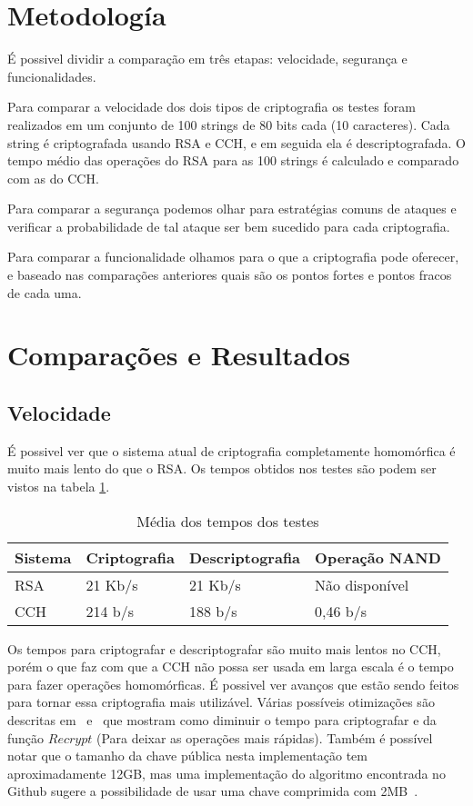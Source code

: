 \section{Metodología}
É possivel dividir a comparação em três etapas: velocidade, segurança e funcionalidades.

Para comparar a velocidade dos dois tipos de criptografia os testes foram realizados em um conjunto de 100 strings de 80 bits cada (10 caracteres). Cada string é criptografada usando RSA e CCH, e em seguida ela é descriptografada. O tempo médio das operações do RSA para as 100 strings é calculado e comparado com as do CCH.
	
Para comparar a segurança podemos olhar para estratégias comuns de ataques e verificar a probabilidade de tal ataque ser bem sucedido para cada criptografia.
	
Para comparar a funcionalidade olhamos para o que a criptografia pode oferecer, e baseado nas comparações anteriores quais são os pontos fortes e pontos fracos de cada uma.
	
\section{Comparações e Resultados}
	\subsection{Velocidade}
	É possivel ver que o sistema atual de criptografia completamente homomórfica é muito mais lento do que o RSA. Os tempos obtidos nos testes são podem ser vistos na tabela \ref{tab:LABEL_TAB_RESULTADOS}.
	
	\begin{table}[!h]
  	\centering
  	\begin{tabular}{ |l|l|l|l| }
    	\hline
      	Sistema & Criptografia & Descriptografia & Operação NAND \\
    	\hline
      	RSA & 21 Kb/s & 21 Kb/s & Não disponível \\
    	\hline
      	CCH & 214 b/s & 188 b/s & 0,46 b/s \\
    	\hline
  	\end{tabular}
  	\caption{Média dos tempos dos testes}
  	\label{tab:LABEL_TAB_RESULTADOS}
	\end{table}

	Os tempos para criptografar e descriptografar são muito mais lentos no CCH, porém o que faz com que a CCH não possa ser usada em larga escala é o tempo para fazer operações homomórficas. É possivel ver avanços que estão sendo feitos para tornar essa criptografia mais utilizável. Várias possíveis otimizações são descritas em~\cite{optone} e~\cite{opttwo} que mostram como diminuir o tempo para criptografar e da função $Recrypt$ (Para deixar as operações mais rápidas). Também é possível notar que o tamanho da chave pública nesta implementação tem aproximadamente 12GB, mas uma implementação do algoritmo encontrada no Github sugere a possibilidade de usar uma chave comprimida com 2MB~\cite{coron}.
	
